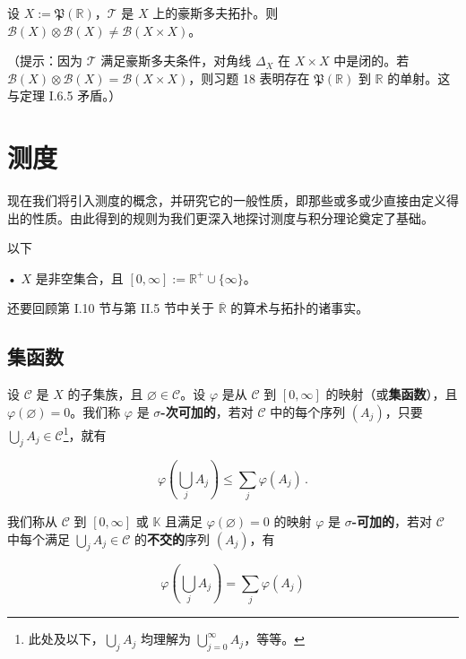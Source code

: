 \begin{exercises}
\item

设 $ X := \mathfrak{P}(\mathbb{R}) $，$ \mathcal{T} $ 是 $ X $ 上的豪斯多夫拓扑。则 $ \mathcal{B}(X)\otimes\mathcal{B}(X)\ne \mathcal{B}(X\times X) $。

（提示：因为 $ \mathcal{T} $ 满足豪斯多夫条件，对角线 $ \Delta_X $ 在 $ X\times X $ 中是闭的。若 $ \mathcal{B}(X)\otimes\mathcal{B}(X)=\mathcal{B}(X\times X) $，则习题 18 表明存在 $ \mathfrak{P}(\mathbb{R}) $ 到 $ \mathbb{R} $ 的单射。这与定理 I.6.5 矛盾。）

\end{exercises}

\section{测度}

现在我们将引入测度的概念，并研究它的一般性质，即那些或多或少直接由定义得出的性质。由此得到的规则为我们更深入地探讨测度与积分理论奠定了基础。

以下

• $ X $ 是非空集合，且 $ [0,\infty] := \mathbb{R}^{+} \cup \{\infty\} $。

还要回顾第 I.10 节与第 II.5 节中关于 $ \overline{\mathbb{R}} $ 的算术与拓扑的诸事实。

\subsection*{集函数}

设 $ \mathcal{C} $ 是 $ X $ 的子集族，且 $ \varnothing \in \mathcal{C} $。设 $ \varphi $ 是从 $ \mathcal{C} $ 到 $ [0,\infty] $ 的映射（或\textbf{集函数}），且 $ \varphi(\varnothing) = 0 $。我们称 $ \varphi $ 是 \textbf{$ \sigma $-次可加的}，若对 $ \mathcal{C} $ 中的每个序列 $ (A_j) $，只要 $ \bigcup_j A_j \in \mathcal{C} $\footnote{此处及以下，$ \bigcup_j A_j $ 均理解为 $ \bigcup_{j=0}^{\infty} A_j $，等等。}，就有

\begin{equation}
\varphi\left(\bigcup_j A_j\right) \le \sum_j \varphi(A_j)\,.\tag{2.1}
\end{equation}

我们称从 $ \mathcal{C} $ 到 $ [0,\infty] $ 或 $ \mathbb{K} $ 且满足 $ \varphi(\varnothing) = 0 $ 的映射 $ \varphi $ 是 \textbf{$ \sigma $-可加的}，若对 $ \mathcal{C} $ 中每个满足 $ \bigcup_j A_j \in \mathcal{C} $ 的\textbf{不交的}序列 $ (A_j) $，有

\begin{equation}
\varphi\left(\bigcup_j A_j\right) = \sum_j \varphi(A_j)\tag{2.2}
\end{equation}

